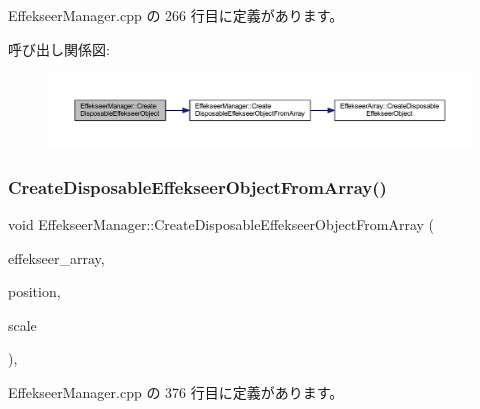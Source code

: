  Effekseer\+Manager.\+cpp の 266 行目に定義があります。

呼び出し関係図\+:\nopagebreak
\begin{figure}[H]
\begin{center}
\leavevmode
\includegraphics[width=350pt]{class_effekseer_manager_a0b82fe25fbe1dacc0d904fb54267b2fa_cgraph}
\end{center}
\end{figure}
\mbox{\label{class_effekseer_manager_ab8fd5fdd35e1336974f217797c010ee3}} 
\subsubsection{\texorpdfstring{Create\+Disposable\+Effekseer\+Object\+From\+Array()}{CreateDisposableEffekseerObjectFromArray()}}
{\footnotesize\ttfamily void Effekseer\+Manager\+::\+Create\+Disposable\+Effekseer\+Object\+From\+Array (\begin{DoxyParamCaption}\item[{\mbox{\hyperlink{class_effekseer_array}{Effekseer\+Array}} $\ast$}]{effekseer\+\_\+array,  }\item[{\mbox{\hyperlink{_vector3_d_8h_ab16f59e4393f29a01ec8b9bbbabbe65d}{Vec3}}}]{position,  }\item[{\mbox{\hyperlink{_vector3_d_8h_ab16f59e4393f29a01ec8b9bbbabbe65d}{Vec3}}}]{scale }\end{DoxyParamCaption})\hspace{0.3cm}{\ttfamily [static]}, {\ttfamily [private]}}



 Effekseer\+Manager.\+cpp の 376 行目に定義があります。

